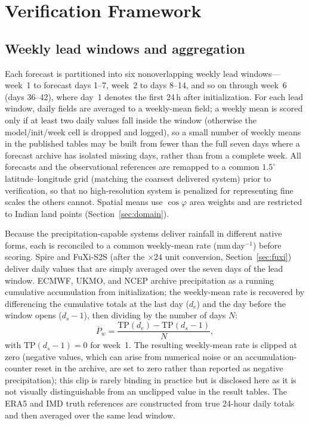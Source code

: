 \documentclass[11pt,a4paper]{article}
\begin{document}
\section{Verification Framework}\label{sec:methods}

\subsection{Weekly lead windows and aggregation}\label{sec:weeks}

Each forecast is partitioned into six nonoverlapping weekly lead
windows---week~1 to forecast days 1--7, week~2 to days 8--14, and so on
through week~6 (days 36--42), where day~1 denotes the first 24\,h after
initialization. For each lead window, daily fields are averaged to a
weekly-mean field; a weekly mean is scored only if at least two daily values
fall inside the window (otherwise the model/init/week cell is dropped and
logged), so a small number of weekly means in the published tables may be
built from fewer than the full seven days where a forecast archive has
isolated missing days, rather than from a complete week. All forecasts and
the observational references are remapped to a common $1.5^{\circ}$
latitude--longitude grid (matching the coarsest delivered system) prior to
verification, so that no high-resolution system is penalized for
representing fine scales the others cannot. Spatial means use $\cos\varphi$
area weights and are restricted to Indian land points (Section~\ref{sec:domain}).

Because the precipitation-capable systems deliver rainfall in different native
forms, each is reconciled to a common weekly-mean rate (mm\,day$^{-1}$) before
scoring. Spire and FuXi-S2S (after the $\times24$ unit conversion,
Section~\ref{sec:fuxi}) deliver daily values that are simply averaged over the
seven days of the lead window. ECMWF, UKMO, and NCEP archive precipitation as
a running cumulative accumulation from initialization; the weekly-mean rate is
recovered by differencing the cumulative totals at the last day ($d_e$) and
the day before the window opens ($d_s-1$), then dividing by the number of
days $N$:
\begin{equation}
  \overline{P}_{w} = \frac{\mathrm{TP}(d_e) - \mathrm{TP}(d_s-1)}{N},
  \label{eq:deaccum}
\end{equation}
with $\mathrm{TP}(d_s-1)=0$ for week~1. The resulting weekly-mean rate is
clipped at zero (negative values, which can arise from numerical noise or an
accumulation-counter reset in the archive, are set to zero rather than
reported as negative precipitation); this clip is rarely binding in practice
but is disclosed here as it is not visually distinguishable from an unclipped
value in the result tables. The ERA5 and IMD truth references are constructed
from true 24-hour daily totals and then averaged over the same lead window.
\end{document}
